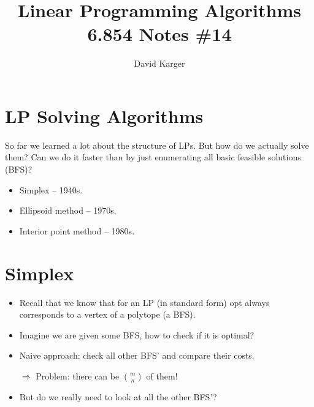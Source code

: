 \documentclass{article}
\title{Linear Programming Algorithms\\ 6.854 Notes \#14}
\author{David Karger}
\begin{document}
\section{LP Solving Algorithms}

So far we learned a lot about the structure of LPs. But how do we actually solve them?
Can we do it faster than by just enumerating all basic feasible solutions (BFS)?

\begin{itemize}
\item Simplex -- 1940s.
\item Ellipsoid method -- 1970s.
\item Interior point method -- 1980s. 
\end{itemize}

\section{Simplex}

\begin{itemize}
\item Recall that we know that for an LP (in standard form) opt always corresponds to a vertex of a polytope (a BFS).
\item Imagine we are given some BFS, how to check if it is optimal? 
\item Naive approach: check all other BFS' and compare their costs. 

$\Rightarrow$ Problem: there can be $m \choose n$ of them! 

\item But do we really need to look at all the other BFS'?

\end{itemize}
\end{document}

